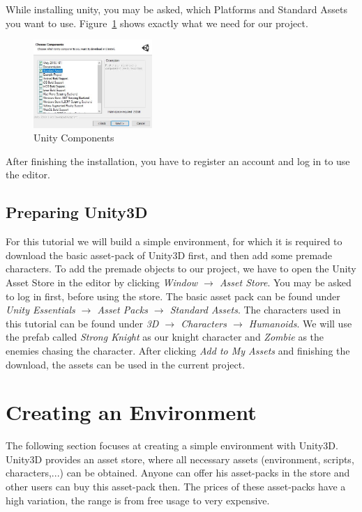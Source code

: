 \documentclass[12pt, a4paper, titlepage]{article}
\begin{document}
While installing unity, you may be asked, which Platforms and Standard Assets you want to use. Figure~\ref{fig:downloading_unity_components} shows exactly what we need for our project.

\begin{figure}[htbp]
  \centering
  \includegraphics[width=0.4\textwidth]{pictures/downloading_unity_components}
  \caption{Unity Components}
  \label{fig:downloading_unity_components}
\end{figure}

After finishing the installation, you have to register an account and log in to use the editor.

\subsection{Preparing Unity3D}
For this tutorial we will build a simple environment, for which it is required to download the basic asset-pack of Unity3D first, and then add some premade characters. To add the premade objects to our project, we have to open the Unity Asset Store in the editor by clicking \emph{Window $\rightarrow$ Asset Store}. You may be asked to log in first, before using the store.
The basic asset pack can be found under \emph{Unity Essentials $\rightarrow$ Asset Packs $\rightarrow$ Standard Assets}\cite{b7}. The characters used in this tutorial can be found under \emph{3D $\rightarrow$ Characters $\rightarrow$ Humanoids}. We will use the prefab called \emph{Strong Knight}\cite{b5} as our knight character and \emph{Zombie}\cite{b6}  as the enemies chasing the character.
After clicking \emph{Add to My Assets} and finishing the download, the assets can be used in the current project.

\section{Creating an Environment}

The following section focuses at creating a simple environment with Unity3D. 
Unity3D provides an asset store, where all necessary assets (environment, scripts, characters,...) can be obtained. Anyone can offer his asset-packs in the store and other users can buy this asset-pack then. The prices of these asset-packs have a high variation, the range is from free usage to very expensive. 
 
\end{document}
